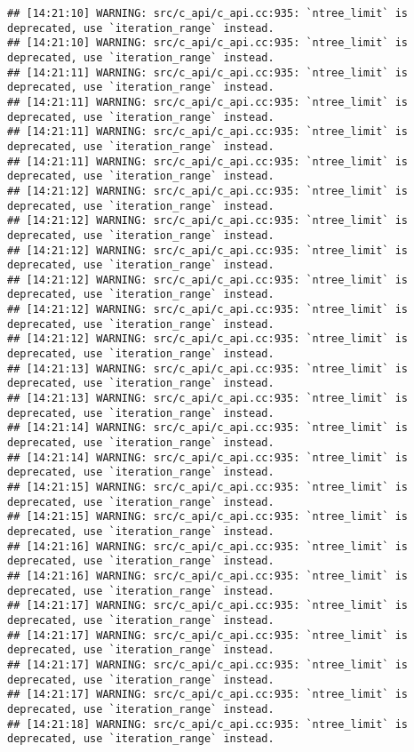 \documentclass[
]{article}
\begin{document}
\begin{verbatim}
## [14:21:10] WARNING: src/c_api/c_api.cc:935: `ntree_limit` is deprecated, use `iteration_range` instead.
## [14:21:10] WARNING: src/c_api/c_api.cc:935: `ntree_limit` is deprecated, use `iteration_range` instead.
## [14:21:11] WARNING: src/c_api/c_api.cc:935: `ntree_limit` is deprecated, use `iteration_range` instead.
## [14:21:11] WARNING: src/c_api/c_api.cc:935: `ntree_limit` is deprecated, use `iteration_range` instead.
## [14:21:11] WARNING: src/c_api/c_api.cc:935: `ntree_limit` is deprecated, use `iteration_range` instead.
## [14:21:11] WARNING: src/c_api/c_api.cc:935: `ntree_limit` is deprecated, use `iteration_range` instead.
## [14:21:12] WARNING: src/c_api/c_api.cc:935: `ntree_limit` is deprecated, use `iteration_range` instead.
## [14:21:12] WARNING: src/c_api/c_api.cc:935: `ntree_limit` is deprecated, use `iteration_range` instead.
## [14:21:12] WARNING: src/c_api/c_api.cc:935: `ntree_limit` is deprecated, use `iteration_range` instead.
## [14:21:12] WARNING: src/c_api/c_api.cc:935: `ntree_limit` is deprecated, use `iteration_range` instead.
## [14:21:12] WARNING: src/c_api/c_api.cc:935: `ntree_limit` is deprecated, use `iteration_range` instead.
## [14:21:12] WARNING: src/c_api/c_api.cc:935: `ntree_limit` is deprecated, use `iteration_range` instead.
## [14:21:13] WARNING: src/c_api/c_api.cc:935: `ntree_limit` is deprecated, use `iteration_range` instead.
## [14:21:13] WARNING: src/c_api/c_api.cc:935: `ntree_limit` is deprecated, use `iteration_range` instead.
## [14:21:14] WARNING: src/c_api/c_api.cc:935: `ntree_limit` is deprecated, use `iteration_range` instead.
## [14:21:14] WARNING: src/c_api/c_api.cc:935: `ntree_limit` is deprecated, use `iteration_range` instead.
## [14:21:15] WARNING: src/c_api/c_api.cc:935: `ntree_limit` is deprecated, use `iteration_range` instead.
## [14:21:15] WARNING: src/c_api/c_api.cc:935: `ntree_limit` is deprecated, use `iteration_range` instead.
## [14:21:16] WARNING: src/c_api/c_api.cc:935: `ntree_limit` is deprecated, use `iteration_range` instead.
## [14:21:16] WARNING: src/c_api/c_api.cc:935: `ntree_limit` is deprecated, use `iteration_range` instead.
## [14:21:17] WARNING: src/c_api/c_api.cc:935: `ntree_limit` is deprecated, use `iteration_range` instead.
## [14:21:17] WARNING: src/c_api/c_api.cc:935: `ntree_limit` is deprecated, use `iteration_range` instead.
## [14:21:17] WARNING: src/c_api/c_api.cc:935: `ntree_limit` is deprecated, use `iteration_range` instead.
## [14:21:17] WARNING: src/c_api/c_api.cc:935: `ntree_limit` is deprecated, use `iteration_range` instead.
## [14:21:18] WARNING: src/c_api/c_api.cc:935: `ntree_limit` is deprecated, use `iteration_range` instead.

\end{verbatim}
\end{document}
